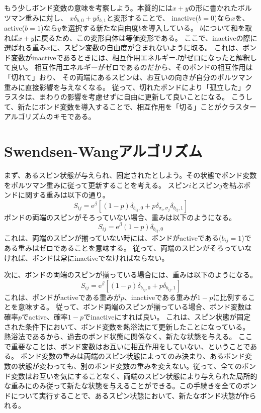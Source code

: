 \documentclass{jarticle}
\begin{document}
もう少しボンド変数の意味を考察しよう。本質的には$x + y$の形に書かれたボルツマン重みに対し、
$x \delta_{b,0}+ y \delta_{b,1}$と変形することで、
inactive($b=0$)なら$x$を、active($b=1$)なら$y$を選択する新たな自由度$b$を導入している。
$b$について和を取れば$x + y$に戻るため、この変形自体は等価変形である。
ここで、inactiveの際に選ばれる重み$x$に、スピン変数の自由度が含まれないように取る。
これは、ボンド変数がinactiveであるときには、相互作用エネルギー$J$がゼロになったと解釈して良い。
相互作用エネルギーがゼロであるのだから、そのボンドの相互作用は「切れて」おり、
その両端にあるスピンは、お互いの向きが自分のボルツマン重みに直接影響を与えなくなる。
従って、切れたボンドにより「孤立した」クラスタは、まわりの影響を考慮せずに自由に更新して良いことになる。
こうして、新たにボンド変数を導入することで、相互作用を「切る」ことがクラスターアルゴリズムのキモである。

\section{Swendsen-Wangアルゴリズム}

まず、あるスピン状態が与えられ、固定されたとしよう。その状態でボンド変数をボルツマン重みに従って更新することを考える。
スピン$i$とスピン$j$を結ぶボンドに関する重みは以下の通り。
\begin{equation}
  S_{ij} = \mathrm{e}^{\beta} \left[(1-p) \delta_{b_{ij},0} +  p \delta_{\sigma_i, \sigma_j} \delta_{b_{ij},1} \right]
\end{equation}
ボンドの両端のスピンがそろっていない場合、重みは以下のようになる。
\begin{equation}
  S_{ij}= \mathrm{e}^{\beta} (1-p) \delta_{b_{ij},0}
\end{equation}
これは、両端のスピンが揃っていない時には、ボンドがactiveである($b_{ij}=1$)である重みはゼロであることを意味する。
従って、両端のスピンがそろっていなければ、ボンドは常にinactiveでなければならない。

次に、ボンドの両端のスピンが揃っている場合には、重みは以下のようになる。
\begin{equation}
  S_{ij}= \mathrm{e}^{\beta} \left[(1-p) \delta_{b_{ij},0} +  p \delta_{b_{ij},1} \right]
\end{equation}
これは、ボンドがactiveである重みが$p$、inactiveである重みが$1-p$に比例することを意味する。
従って、ボンド両端のスピンが揃っている場合、ボンド変数は確率$p$でactive、確率$1-p$でinactiveにすれば良い。
これは、スピン状態が固定された条件下において、ボンド変数を熱浴法にて更新したことになっている。
熱浴法であるから、過去のボンド状態に関係なく、新たな状態を与える。
ここで重要なことは、ボンド変数はお互いに相互作用をしていない、ということである。
ボンド変数の重みは両端のスピン状態によってのみ決まり、あるボンド変数の状態が変わっても、別のボンド変数の重みを変えない。従って、全てのボンド変数はお互いを気にすることなく、両端のスピン状態により与えられた局所的な重みにのみ従って新たな状態を与えることができる。この手続きを全てのボンドについて実行することで、あるスピン状態において、新たなボンド状態が作られる。
\end{document}
